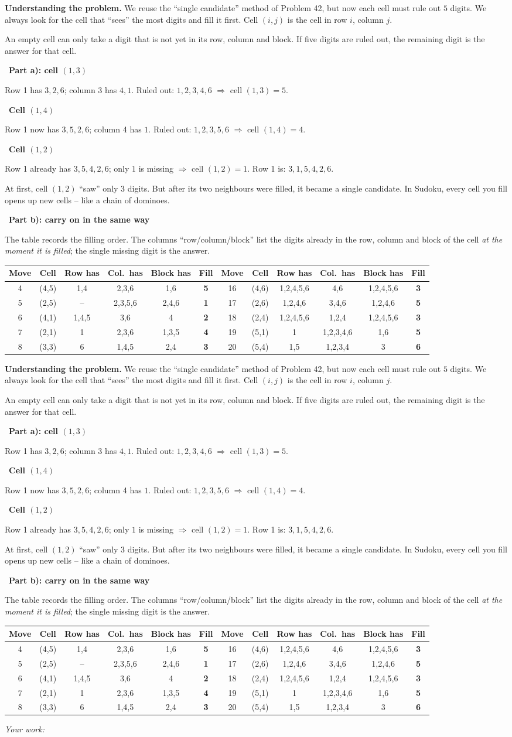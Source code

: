 \documentclass[11pt]{article}
\newif\ifsol \soltrue
\renewcommand{\arraystretch}{1.35}
\newcommand{\StuProb}[2]{\begin{probboxS}{#1}{#2}\StuProbBody\end{probboxS}}
\newcommand{\probsol}[1]{%
  \begin{lrbox}{\solmeasure}\begin{minipage}{\dimexpr\linewidth-24pt\relax}#1\end{minipage}\end{lrbox}%
  \ifsol
    \begin{solbox}#1\end{solbox}%
  \else
    \setlength{\solht}{\dimexpr\ht\solmeasure+\dp\solmeasure+0.85cm\relax}%
    \ifdim\solht<1.35cm\setlength{\solht}{1.35cm}\fi
    \ifdim\solht>\StudentMaxWork\setlength{\solht}{\StudentMaxWork}\fi
    \par\noindent\begin{minipage}{\linewidth}%
    \expandafter\StuProb\StuProbArgs
    \begin{tcolorbox}[colback=white,colframe=Line,boxrule=0.8pt,arc=5pt,
      left=8pt,right=8pt,top=4pt,bottom=4pt,height=\solht]{\footnotesize\color{Slate}\itshape\WorkWord}\end{tcolorbox}%
    \end{minipage}\par\medskip
  \fi}
\newlength{\StudentMaxWork}\setlength{\StudentMaxWork}{4.5cm}
\newcommand{\step}[2]{\par\smallskip\noindent{\bfseries\color{tmBlue!85!black}\StepWord~#1.}\ {\bfseries #2}\par\nopagebreak}
\def\WorkWord{Your work:}
\def\StepWord{Step}
\begin{document}
\probsol{
\textbf{Understanding the problem.} We reuse the ``single candidate'' method of Problem 42, but now each cell must rule out $5$ digits.
We always look for the cell that ``sees'' the most digits and fill it first. Cell $(i, j)$ is the cell in row $i$, column $j$.
\begin{recallbox}An empty cell can only take a digit that is not yet in its row, column and block. If five digits are ruled out, the
remaining digit is the answer for that cell.\end{recallbox}
\step{1}{Part a): cell $(1,3)$}
Row 1 has $3, 2, 6$; column 3 has $4, 1$. Ruled out: $1, 2, 3, 4, 6$ $\Rightarrow$ cell $(1,3) = 5$.
\step{2}{Cell $(1,4)$}
Row 1 now has $3, 5, 2, 6$; column 4 has $1$. Ruled out: $1, 2, 3, 5, 6$ $\Rightarrow$ cell $(1,4) = 4$.
\step{3}{Cell $(1,2)$}
Row 1 already has $3, 5, 4, 2, 6$; only $1$ is missing $\Rightarrow$ cell $(1,2) = 1$. Row 1 is: $3, 1, 5, 4, 2, 6$.
\begin{tipbox}At first, cell $(1,2)$ ``saw'' only $3$ digits. But after its two neighbours were filled, it became a single candidate.
In Sudoku, every cell you fill opens up new cells -- like a chain of dominoes.\end{tipbox}
\step{4}{Part b): carry on in the same way}
The table records the filling order. The columns ``row/column/block'' list the digits already in the row, column and block of the cell
\emph{at the moment it is filled}; the single missing digit is the answer.
\begin{center}\scriptsize
\setlength{\tabcolsep}{3pt}\renewcommand{\arraystretch}{1.12}
\begin{tabular}{|c|c|c|c|c|c||c|c|c|c|c|c|}
\hline
\rowcolor{tmBlue!10} Move & Cell & Row has & Col.\ has & Block has & Fill & Move & Cell & Row has & Col.\ has & Block has & Fill\\ \hline
4 & (4,5) & 1,4 & 2,3,6 & 1,6 & \textbf{5} & 16 & (4,6) & 1,2,4,5,6 & 4,6 & 1,2,4,5,6 & \textbf{3}\\ \hline
5 & (2,5) & -- & 2,3,5,6 & 2,4,6 & \textbf{1} & 17 & (2,6) & 1,2,4,6 & 3,4,6 & 1,2,4,6 & \textbf{5}\\ \hline
6 & (4,1) & 1,4,5 & 3,6 & 4 & \textbf{2} & 18 & (2,4) & 1,2,4,5,6 & 1,2,4 & 1,2,4,5,6 & \textbf{3}\\ \hline
7 & (2,1) & 1 & 2,3,6 & 1,3,5 & \textbf{4} & 19 & (5,1) & 1 & 1,2,3,4,6 & 1,6 & \textbf{5}\\ \hline
8 & (3,3) & 6 & 1,4,5 & 2,4 & \textbf{3} & 20 & (5,4) & 1,5 & 1,2,3,4 & 3 & \textbf{6}\\ \hline

\end{tabular}
\end{center}}
\end{document}
